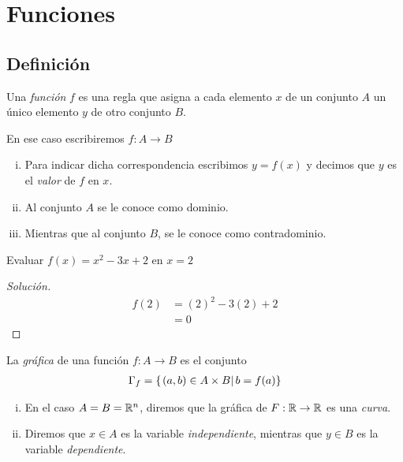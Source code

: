 \section{Funciones}

\subsection{Definición}
{}
  Una \emph{función} $f$ es una regla que asigna a cada elemento $x$ de un conjunto $A$ un único elemento $y$ de otro conjunto $B$. 
  
  En ese caso escribiremos $f:A \to B$

{}
\begin{enumerate}[(i)]
  \item 
  Para indicar dicha correspondencia escribimos $y=f(x)$ y decimos que $y$ es el \emph{valor} de $f$ en $x$. 
  \item Al conjunto $A$ se le conoce como dominio. 
  \item Mientras que al conjunto $B$, se le conoce como contradominio.
\end{enumerate}

{}
  \begin{problema}
   Evaluar $f(x)=x^{2}-3x+2$ en $x=2$
  \end{problema}

  \begin{proof}[Solución]
     \begin{align} 
	f(2) &= (2)^{2}-3(2)+2 \\
   &=  0
   \end{align}
  \end{proof}

{}
  \begin{defn}
   La \emph{gráfica} de una función $f: A \to B$ es el conjunto 
       \begin{align}    
   \Gamma_{f} = \left\{ \left.\left( a,b \right)\in A\times B \right| b=f(a) \right\}
    \end{align}
  \end{defn}


{}
\begin{enumerate}[(i)]
  \item 
  En el caso $A=B=\mathbb{R}^{n}$, diremos que la gráfica de $F:\mathbb{R} \to \mathbb{R}$ es una \emph{curva}. 
  
  \item Diremos que $x\in A$ es la variable \emph{independiente},  mientras que $y\in B$ es la variable \emph{dependiente}.
\end{enumerate}

